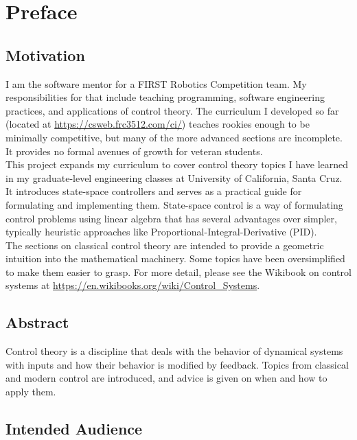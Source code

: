 
\chapter*{Preface}

\section*{Motivation}

I am the software mentor for a FIRST Robotics Competition team. My
responsibilities for that include teaching programming, software engineering
practices, and applications of control theory. The curriculum I developed so far
(located at \url{https://csweb.frc3512.com/ci/}) teaches rookies enough to be
minimally competitive, but many of the more advanced sections are incomplete. It
provides no formal avenues of growth for veteran students. \\

This project expands my curriculum to cover control theory topics I have learned
in my graduate-level engineering classes at University of California,
Santa Cruz. It introduces state-space controllers and serves as a practical
guide for formulating and implementing them. State-space control is a way of
formulating control problems using linear algebra that has several advantages
over simpler, typically heuristic approaches like
Proportional-Integral-Derivative (PID). \\

The sections on classical control theory are intended to provide a geometric
intuition into the mathematical machinery. Some topics have been oversimplified
to make them easier to grasp. For more detail, please see the Wikibook on
control systems at \url{https://en.wikibooks.org/wiki/Control_Systems}.

\section*{Abstract}

Control theory is a discipline that deals with the behavior of dynamical
\glspl{system} with inputs and how their behavior is modified by feedback.
Topics from classical and modern control are introduced, and advice is given on
when and how to apply them.

\section*{Intended Audience}

